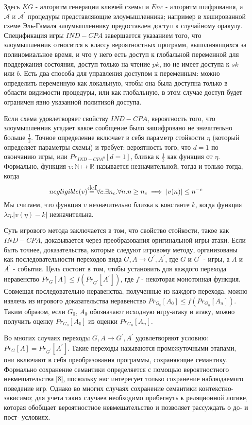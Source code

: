 \documentclass[a4paper,12pt]{report}
\newcommand\myeq{\stackrel{\mathclap{\normalfont\mbox{def}}}{=}}
\begin{document}
Здесь $KG$ - алгоритм генерации ключей схемы и $Enc$ - алгоритм шифрования, а $\mathcal{A}$ и $\mathcal{A}^{\prime}$ процедуры представляющие злоумышленника; например в хешированной схеме Эль-Гамаля злоумышленнику предоставлен доступ к случайному оракулу. Спецификация игры $IND-CPA$ завершается указанием того, что злоумышленник относится к классу вероятностных программ, выполняющихся за полиномиальное время, и что у него есть доступ к глобальной переменной для поддержания состояния, доступ только на чтение $pk$, но не имеет доступа к $sk$ или $b$. Есть два способа для управления доступом к переменным: можно определить переменную как локальную, чтобы она была доступна только в области видимости процедуры, или как глобальную, в этом случае доступ будет ограничен явно указанной политикой доступа.
\par
Если схема удовлетворяет свойству $IND-CPA$, вероятность того, что  злоумышленник угадает какое сообщение было зашифровано не значительно больше $\frac{1}{2}$. Точное определение включает в себя параметр стойкости $\eta$ (который определяет параметры схемы) и требует: вероятность того, что $d = 1$ по окончанию игры, или $Pr_{IND-CPA^\eta}[d = 1]$, близка к $\frac{1}{2}$ как функция от $\eta$. Формально, функция $v: \mathbb{N} \mapsto \mathbb{R}$ называется незначительной, тогда и только тогда, когда
\[negligible(v) \myeq \forall c. \exists n_c. \forall n. n \geq n_c \implies \lvert v(n) \rvert \leq n^{-c} \]
Мы считаем, что функция $v$ незначительно близка к константе $k$, когда функция $\lambda\eta.\lvert v(\eta) - k \rvert$ незначительна.
\par
Суть игрового метода заключается в том, что свойство стойкости, такое как $IND-CPA$, доказывается через преобразования оригинальной игры-атаки. Если быть точнее, доказательства, которые следуют игровому методу, организованы как последовательности переходов вида $G, A \rightarrow G^\prime, A^\prime$, где $G$ и $G^\prime$ - игры, а $A$ и $A^\prime$ - события. Цель состоит в том, чтобы установить для каждого перехода неравенство $Pr_G[A] \leq f(Pr_{G^\prime}[A^\prime])$, где $f$ - некоторая монотонная функция. Совмещая последовательно неравенства, полученные из каждого перехода, можно извлечь из игрового доказательства неравенство $Pr_{G_0}[A_0] \leq f(Pr_{G_n}[A_n])$. Таким образом, если $G_0$, $A_0$ обозначают исходную игру-атаку и атаку, можно получить оценку $Pr_{G_0}[A_0]$ из оценки $Pr_{G_n}[A_n]$.
\par
Во многих случаях переходы $G, A \rightarrow G^\prime, A^\prime$ удовлетворяют условию: $Pr_G[A] = Pr_{G^\prime}[A^\prime]$. Такие переходы называются промежуточными этапами, они включают в себя преобразования программы, сохраняющие семантику. Формально сохранение семантики определяется с помощью вероятностного невмешательства [8], поскольку нас интересует только сохранение наблюдаемого поведение игр. Однако во многих случаях сохранение семантики контекстно-зависимо; для учета таких случаев необходимо прибегнуть к реляционной логике, которая обобщает вероятностное невмешательство и позволяет рассуждать о до- и пост- условиях.
\end{document}
